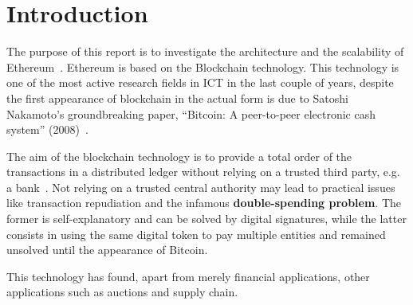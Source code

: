 \section*{Introduction}

The purpose of this report is to investigate the architecture and the 
scalability of Ethereum~\cite{wood2018ethereum}. Ethereum is based on the 
Blockchain technology. This technology is one of the most active research
fields in ICT in the last couple of years, despite the first appearance of
blockchain in the actual form is due to Satoshi Nakamoto's groundbreaking 
paper, ``Bitcoin: A peer-to-peer electronic cash system''
(2008)~\cite{bib:bitcoin}. 

The aim of the blockchain technology is to provide a total order of the 
transactions in a distributed ledger without relying on a trusted third party, 
e.g. a bank~\cite{bib:the-quest}. Not relying on a trusted central authority
may lead to practical issues like transaction repudiation and the infamous 
\textbf{double-spending problem}. The former is self-explanatory and can
be solved by digital signatures, while the latter consists in using the same
digital token to pay multiple entities and remained unsolved until the 
appearance of Bitcoin.

This technology has found, apart from merely financial applications, other
applications such as auctions and supply chain.


